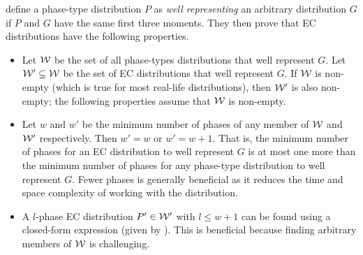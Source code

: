 \documentclass[thesis.tex]{subfiles}
\begin{document}
\Textcite{osogamiClosed} define a phase-type distribution $P$ as \emph{well representing} an arbitrary distribution $G$ if $P$ and $G$ have the same first three moments.
They then prove that EC distributions have the following properties.
\begin{itemize}
    \item Let $\mathcal{W}$ be the set of all phase-types distributions that well represent $G$.
        Let $\mathcal{W}' \subseteq \mathcal{W}$ be the set of EC distributions that well represent $G$.
        If $\mathcal{W}$ is non-empty (which is true for most real-life distributions), then $\mathcal{W'}$ is also non-empty; the following properties assume that $\mathcal{W}$ is non-empty.
    \item Let $w$ and $w'$ be the minimum number of phases of any member of $\mathcal{W}$ and $\mathcal{W'}$ respectively.
        Then $w' = w$ or $w' = w + 1$.
        That is, the minimum number of phases for an EC distribution to well represent $G$ is at most one more than the minimum number of phases for any phase-type distribution to well represent $G$.
        Fewer phases is generally beneficial as it reduces the time and space complexity of working with the distribution.
    \item A $l$-phase EC distribution $P' \in \mathcal{W'}$ with $l \leq w + 1$ can be found using a closed-form expression (given by \textcite{osogamiClosed}).
        This is beneficial because finding arbitrary members of $\mathcal{W}$ is challenging.
\end{itemize}
\end{document}
